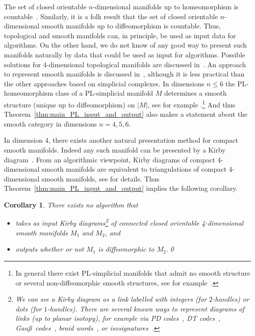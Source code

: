 \documentclass[a4paper, reqno]{amsart}
\newtheorem{corollary}[proposition]{Corollary}
\theoremstyle{definition}
\theoremstyle{remark}
\renewcommand{\~}{\nobreak\ }
\begin{document}

The set of closed orientable $n$-dimensional manifolds up to homeomorphism is countable\~\cite{Cheeger_Kister}. Similarly, it is a folk result that the set of closed orientable $n$-dimensional smooth manifolds up to diffeomorphism is countable. Thus, topological and smooth manifolds can, in principle, be used as input data for algorithms. On the other hand, we do not know of any good way to present such manifolds naturally by data that could be used as input for algorithms. Possible solutions for 4-dimensional topological manifolds are discussed in\~\cite{Freedman_Zuddas,algorithm_4_manifold}. An approach to represent smooth manifolds is discussed in\~\cite{BooneHakenPoenaru}, although it is less practical than the other approaches based on simplicial complexes. In dimensions $n\leq6$ the PL-homeomorphism class of a PL-simplicial manifold $M$ determines a smooth structure (unique up to diffeomorphism) on $|M|$, see for example \cite[Theorem 2]{Milnor_46later}.\footnote{In general there exist PL-simplicial manifolds that admit no smooth structure or several non-diffeomorphic smooth structures, see for example\~\cite{Milnor_46later}.} And thus Theorem\~\ref{thm:main_PL_input_and_output} also makes a statement about the smooth category in dimensions $n=4,5,6$. 

In dimension $4$, there exists another natural presentation method for compact smooth manifolds. Indeed any such manifold can be presented by a Kirby diagram\~\cite{GS}. From an algorithmic viewpoint, Kirby diagrams of compact 4-dimensional smooth  manifolds are equivalent to triangulations of compact 4-dimensional smooth manifolds, see  \cite[Lemma 8.2]{algorithm_4_manifold} for details. Thus Theorem\~\ref{thm:main_PL_input_and_output} implies the following corollary.

\begin{corollary}
\label{cor:main_Kirby_input_and_output_diff}
There exists no algorithm that 
\begin{itemize}
    \item takes as input Kirby diagrams\footnote{We can see a Kirby diagram as a link labelled with integers (for $2$-handles) or dots (for $1$-handles). There are several known ways to represent diagrams of links (up to planar isotopy), for example via PD codes~\cite{knotatlas,Mast}, DT codes~\cite{dt_codes}, Gau\ss\ codes~\cite{KnotInfo}, braid words~\cite{Artin}, or isosignatures~\cite{regina}.} of connected closed orientable 4-dimensional smooth manifolds $M_1$ and $M_2$, and 
    \item outputs whether or not $M_1$ is diffeomorphic to $M_2$.\qed
\end{itemize}
\end{corollary}
\end{document}
